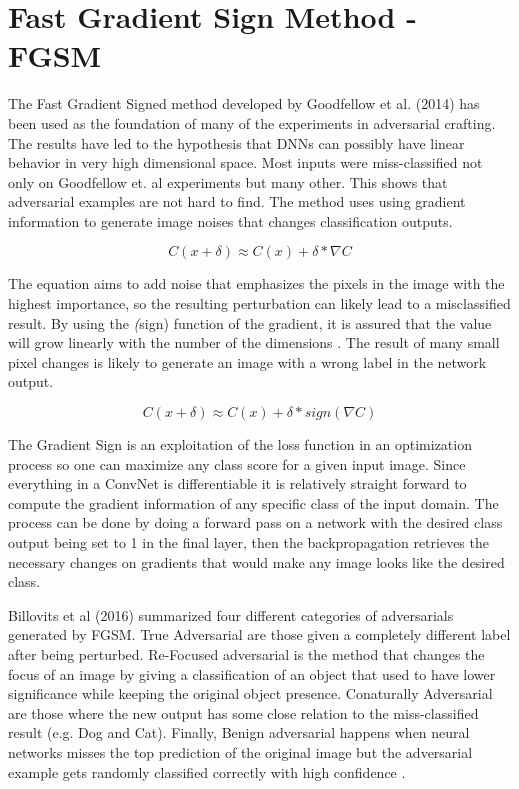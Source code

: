 \section{Fast Gradient Sign Method - FGSM}

The Fast Gradient Signed method developed by Goodfellow et al. (2014) has been used as the foundation of many of the experiments in adversarial crafting. The results have led to the hypothesis that DNNs can possibly have linear behavior in very high dimensional space.  Most inputs were miss-classified not only on Goodfellow et. al \cite{goodfellow2014}  experiments but many other. This shows that adversarial examples are not hard to find. The method uses using gradient information to generate image noises that changes classification outputs.

$$ C(x + \delta)\approx C(x) + \delta * \nabla C$$

The equation aims to add noise that emphasizes the pixels in the image with the highest importance, so the resulting perturbation can likely lead to a misclassified result. By using the \textit(sign) function of the gradient, it is assured that the value will grow linearly with the number of the dimensions \cite{goodfellow2014}. The result of many small pixel changes is likely to generate an image with a wrong label in the network output.

$$ C(x + \delta)\approx C(x) + \delta * sign(\nabla C)$$

The Gradient Sign is an exploitation of the loss function in an optimization process so one can maximize any class score for a given input image. Since everything in a ConvNet is differentiable it is relatively straight forward to compute the gradient information of any specific class of the input domain. The process can be done by doing a forward pass on a network with the desired class output being set to 1 in the final layer, then the backpropagation retrieves the necessary changes on gradients that would make any image looks like the desired class. 

Billovits et al (2016) summarized four different categories of adversarials generated by FGSM. True Adversarial are those given a completely different label after being perturbed. Re-Focused adversarial is the method that changes the focus of an image by giving a classification of an object that used to have lower significance while keeping the original object presence. Conaturally Adversarial are those where the new output has some close relation to the miss-classified result (e.g. Dog and Cat). Finally, Benign adversarial happens when neural networks misses the top prediction of the original image but the adversarial example gets randomly classified correctly with high confidence \cite{billovits}.

